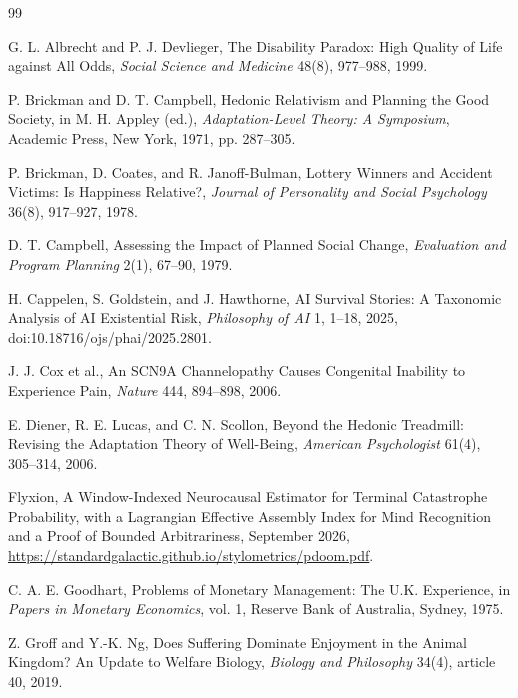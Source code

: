 \documentclass[11pt]{article}
\begin{document}
\begin{thebibliography}{99}

 G. L. Albrecht and P. J. Devlieger, The Disability Paradox: High Quality of Life against All Odds, \emph{Social Science and Medicine} 48(8), 977--988, 1999.

 P. Brickman and D. T. Campbell, Hedonic Relativism and Planning the Good Society, in M. H. Appley (ed.), \emph{Adaptation-Level Theory: A Symposium}, Academic Press, New York, 1971, pp. 287--305.

 P. Brickman, D. Coates, and R. Janoff-Bulman, Lottery Winners and Accident Victims: Is Happiness Relative?, \emph{Journal of Personality and Social Psychology} 36(8), 917--927, 1978.

 D. T. Campbell, Assessing the Impact of Planned Social Change, \emph{Evaluation and Program Planning} 2(1), 67--90, 1979.

 H. Cappelen, S. Goldstein, and J. Hawthorne, AI Survival Stories: A Taxonomic Analysis of AI Existential Risk, \emph{Philosophy of AI} 1, 1--18, 2025, doi:10.18716/ojs/phai/2025.2801.

 J. J. Cox et al., An SCN9A Channelopathy Causes Congenital Inability to Experience Pain, \emph{Nature} 444, 894--898, 2006.

 E. Diener, R. E. Lucas, and C. N. Scollon, Beyond the Hedonic Treadmill: Revising the Adaptation Theory of Well-Being, \emph{American Psychologist} 61(4), 305--314, 2006.

 Flyxion, A Window-Indexed Neurocausal Estimator for Terminal Catastrophe Probability, with a Lagrangian Effective Assembly Index for Mind Recognition and a Proof of Bounded Arbitrariness, September 2026, \url{https://standardgalactic.github.io/stylometrics/pdoom.pdf}.

 C. A. E. Goodhart, Problems of Monetary Management: The U.K. Experience, in \emph{Papers in Monetary Economics}, vol. 1, Reserve Bank of Australia, Sydney, 1975.

 Z. Groff and Y.-K. Ng, Does Suffering Dominate Enjoyment in the Animal Kingdom? An Update to Welfare Biology, \emph{Biology and Philosophy} 34(4), article 40, 2019.


\end{thebibliography}
\end{document}
